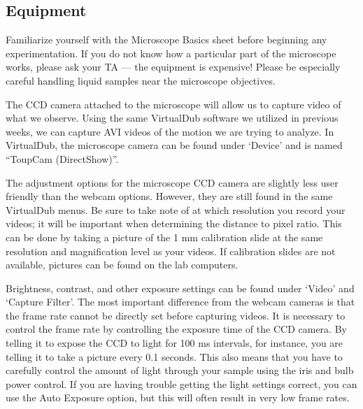 \subsection*{Equipment}
Familiarize yourself with the Microscope Basics sheet before beginning any experimentation. 
If you do not know how a particular part of the microscope works, please ask your TA — the equipment is expensive! 
Please be especially careful handling liquid samples near the microscope objectives. 
\par
The CCD camera attached to the microscope will allow us to capture video of what we observe. 
Using the same VirtualDub software we utilized in previous weeks, we can capture AVI videos of the motion we are trying to analyze. 
In VirtualDub, the microscope camera can be found under `Device' and is named ``ToupCam (DirectShow)''. 
\par  
The adjustment options for the microscope CCD camera are slightly less user friendly than the webcam options. 
However, they are still found in the same VirtualDub menus. 
Be sure to take note of at which resolution you record your videos; it will be important when determining the distance to pixel ratio. 
This can be done by taking a picture of the 1 mm calibration slide at the same resolution and magnification level as your videos. 
If calibration slides are not available, pictures can be found on the lab computers. 
\par 
Brightness, contrast, and other exposure settings can be found under `Video' and `Capture Filter'. 
The most important difference from the webcam cameras is that the frame rate cannot be directly set before capturing videos. 
It is necessary to control the frame rate by controlling the exposure time of the CCD camera. 
By telling it to expose the CCD to light for 100 ms intervals, for instance, you are telling it to take a picture every 0.1 seconds.
This also means that you have to carefully control the amount of light through your sample using the iris and bulb power control. 
If you are having trouble getting the light settings correct, you can use the Auto Exposure option, but this will often result in very low frame rates.

